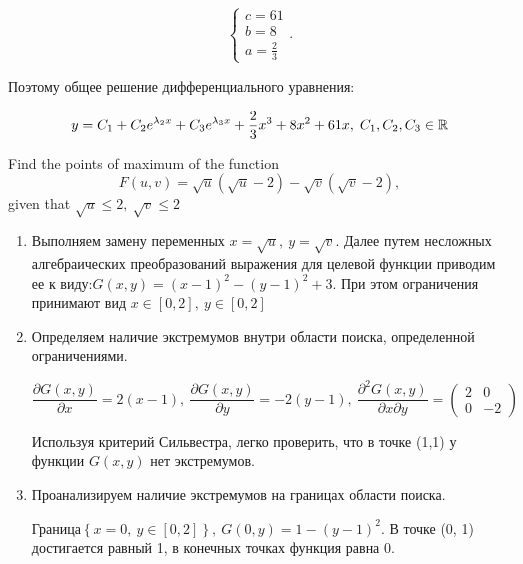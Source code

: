 \documentclass[addpoints, answers]{exam} %
\begin{document}
\begin{questions}
\begin{solution}
  \[\left\{\begin{array}{l} {c=61} \\ {b=8} \\ {a=\frac{2}{3} } \end{array}\right. .\]

  Поэтому общее решение дифференциального уравнения:

  \[y=C_{1} +C_{2} e^{\lambda_2 x} +C_{3} e^{\lambda_3 x} +\frac{2}{3} x^{3} +8x^{2} +61x,\; C_{1} ,C_{2} ,C_{3} \in \mathbb R \]

\end{solution}





\question[10] Find the points of maximum of the function
\[
F\left(u,v\right)=\sqrt{u}\left(\sqrt{u}-2\right)-\sqrt{v}\left(\sqrt{v}-2\right),
\]
given that  $\sqrt{u}\le 2,\ \sqrt{v}\le 2$


\begin{solution}
  \begin{enumerate}
  \item  Выполняем замену переменных $x=\sqrt{u},\ y=\sqrt{v}$. Далее путем несложных алгебраических преобразований выражения для целевой функции приводим ее к виду:$G\left(x,y\right)={\left(x-1\right)}^2-{\left(y-1\right)}^2+3$. При этом ограничения принимают вид $x\in \left[0,2\right],\ y\in \left[0,2\right]$

  \item  Определяем наличие экстремумов внутри области поиска, определенной ограничениями.

  \[\frac{\partial G\left(x,y\right)}{\partial x}=2\left(x-1\right),\ \frac{\partial G\left(x,y\right)}{\partial y}=-2\left(y-1\right),\ \frac{{\partial }^2G\left(x,y\right)}{\partial x\partial y}=\left( \begin{array}{cc}
  2 & 0 \\
  0 & -2 \end{array}
  \right)\]


Используя критерий Сильвестра, легко проверить, что в точке (1,1) у функции $G(x,y)$ нет экстремумов.

\item  Проанализируем наличие экстремумов на границах области поиска.

Граница$\left\{x=0,\ y\in \left[0,2\right]\right\},\ G\left(0,y\right)=1-{\left(y-1\right)}^2$. В точке (0, 1) достигается \textbf{} равный 1, в конечных точках функция равна 0.


\end{enumerate}
\end{solution}
\end{questions}
\end{document}
